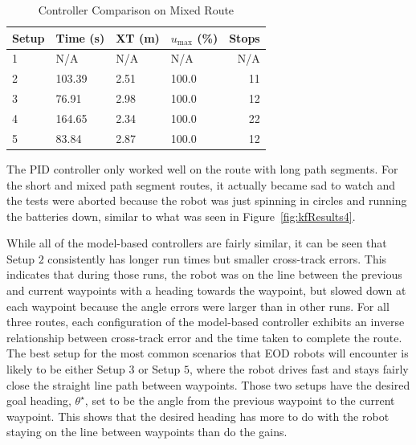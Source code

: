 \begin{table}[ht!]
\caption{Controller Comparison on Mixed Route}
\small
\centering
\begin{tabular}{@{}llllr@{}} \toprule
Setup & Time (s) & XT (m) & $u_{\text{max}}$ (\%) & Stops \\ \midrule
1     & N/A      & N/A    & N/A                   & N/A   \\
2     & 103.39   & 2.51   & 100.0                 & 11    \\
3     & 76.91    & 2.98   & 100.0                 & 12    \\
4     & 164.65   & 2.34   & 100.0                 & 22    \\
5     & 83.84    & 2.87   & 100.0                 & 12    \\ \bottomrule
\end{tabular}
\label{tab:resultsControllersMixed}
\end{table}

The PID controller only worked well on the route with long path segments. For the short and mixed path segment routes, it actually became sad to watch and the tests were aborted because the robot was just spinning in circles and running the batteries down, similar to what was seen in Figure~\ref{fig:kfResults4}.

While all of the model-based controllers are fairly similar, it can be seen that Setup $2$ consistently has longer run times but smaller cross-track errors. This indicates that during those runs, the robot was on the line between the previous and current waypoints with a heading towards the waypoint, but slowed down at each waypoint because the angle errors were larger than in other runs. For all three routes, each configuration of the model-based controller exhibits an inverse relationship between cross-track error and the time taken to complete the route. The best setup for the most common scenarios that EOD robots will encounter is likely to be either Setup $3$ or Setup $5$, where the robot drives fast and stays fairly close the straight line path between waypoints. Those two setups have the desired goal heading, $\theta^\star$, set to be the angle from the previous waypoint to the current waypoint. This shows that the desired heading has more to do with the robot staying on the line between waypoints than do the gains.
